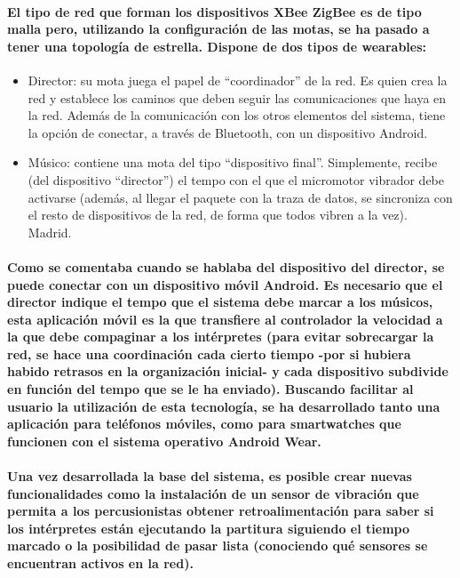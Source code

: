 \paragraph{
El tipo de red que forman los dispositivos XBee ZigBee es de tipo malla pero, utilizando la configuración de las motas, se ha pasado a tener una topología de estrella. Dispone de dos tipos de wearables:
}
  \begin{itemize}
  \item Director: su mota juega el papel de “coordinador” de la red. Es quien crea la red y establece los caminos que deben seguir las comunicaciones que haya en la red. Además de la comunicación con los otros elementos del sistema, tiene la opción de conectar, a través de Bluetooth, con un dispositivo Android.
  \item Músico: contiene una mota del tipo “dispositivo final”. Simplemente, recibe (del dispositivo “director”) el tempo con el que el micromotor vibrador debe activarse (además, al llegar el paquete con la traza de datos, se sincroniza con el resto de dispositivos de la red, de forma que todos vibren a la vez).
   Madrid.
  \end{itemize}

\paragraph{
Como se comentaba cuando se hablaba del dispositivo del director, se puede conectar con un dispositivo móvil Android. Es necesario que el director indique el tempo que el sistema debe marcar a los músicos, esta aplicación móvil es la que transfiere al controlador la velocidad a la que debe compaginar a los intérpretes (para evitar sobrecargar la red, se hace una coordinación cada cierto tiempo -por si hubiera habido retrasos en la organización inicial- y cada dispositivo subdivide en función del tempo que se le ha enviado). Buscando facilitar al usuario la utilización de esta tecnología, se ha desarrollado tanto una aplicación para teléfonos móviles, como para smartwatches que funcionen con el sistema operativo Android Wear.
}

\paragraph{
Una vez desarrollada la base del sistema, es posible crear nuevas funcionalidades como la instalación de un sensor de vibración que permita a los percusionistas obtener retroalimentación para saber si los intérpretes están ejecutando la partitura siguiendo el tiempo marcado o la posibilidad de pasar lista (conociendo qué sensores se encuentran activos en la red).
}
\cleardoublepage



